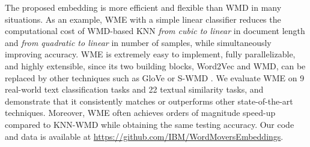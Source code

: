 \documentclass[11pt,a4paper]{article}
\newcommand{\1}{\boldsymbol{1}}
\begin{document}
The proposed embedding is more efficient and flexible than WMD in many situations. As an example, WME with a simple linear classifier reduces the computational cost of WMD-based KNN \emph{from cubic to linear} in document length and \emph{from quadratic to linear} in number of samples, while simultaneously improving accuracy.
WME is extremely easy to implement, fully parallelizable, and highly extensible, since its two building blocks, Word2Vec and WMD, can be replaced by other techniques such as GloVe \cite{pennington2014glove,wieting2015ppdb} or S-WMD \cite{huang2016supervised}.  We evaluate WME on 9 real-world text classification tasks and 22 textual similarity tasks, and demonstrate that it consistently matches or outperforms other state-of-the-art techniques. Moreover, WME often achieves orders of magnitude speed-up compared to KNN-WMD while obtaining the same testing accuracy. Our code and data is available at {\small \url{https://github.com/IBM/WordMoversEmbeddings}}.

\end{document}
